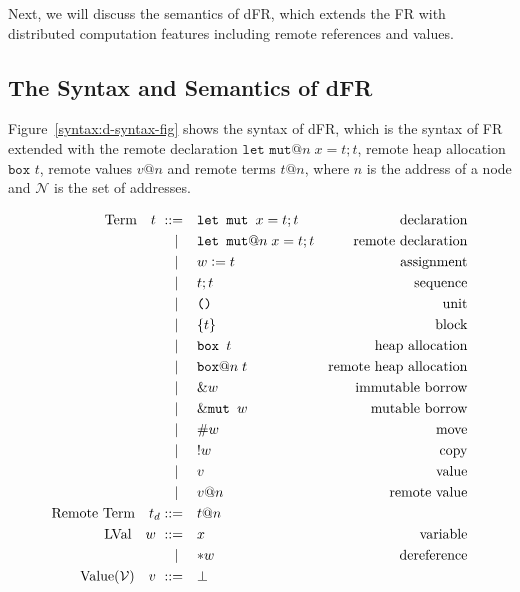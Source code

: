Next, we will discuss the semantics of dFR, which extends the FR with distributed computation features including remote references and values.
\subsection{The Syntax and Semantics of dFR} 
\label{semantics:dfr}
Figure~\ref{syntax:d-syntax-fig} shows the syntax of dFR, which is the syntax of FR extended with the remote declaration $\texttt{let mut}@n\; x = t;t$, remote heap allocation $\texttt{box } t$, remote values $v@n$ and remote terms $t@n$, where $n$ is the address of a node and $\mathcal{N}$ is the set of addresses. 
\begin{figure}
\begin{alignat*}{3}
    \text{Term} \quad t \ \metaDeff \quad &\texttt{let mut } x = t;t &\text{declaration}\\
    \cmid \quad &\texttt{let mut}@n\; x = t;t &\text{remote declaration}\\
    \cmid \quad &w \metaDef t &\text{assignment}\\
    \cmid \quad &t;t &\text{sequence}\\
    \cmid \quad &\texttt{()} &\text{unit}\\
    \cmid \quad &\{t\} &\text{block}\\
    \cmid \quad &\texttt{box } t &\text{heap allocation}\\
    \cmid \quad &\texttt{box}@n\; t &\text{remote  heap allocation}\\
    \cmid \quad &\&w \quad &\text{immutable borrow} \\
    \cmid \quad &\&\texttt{mut } w \quad &\text{mutable borrow} \\
    \cmid \quad &\#{w} \quad &\text{move} \\
    \cmid \quad &!{w} \quad &\text{copy} \\
    \cmid \quad &v \quad &\text{value} \\
    \cmid \quad &v@n \quad &\text{remote value}\\
    \text{Remote Term} \quad t_d \metaDeff \quad &t@n\\
    \text{LVal} \quad w \ \metaDeff \quad &x \quad &\text{variable} \\
    \cmid \quad &{*}w \quad &\text{dereference} \\
    \text{Value}(\mathcal{V}) \quad v \ \metaDeff \quad &\bot\\ 

\end{alignat*}
\end{figure}
